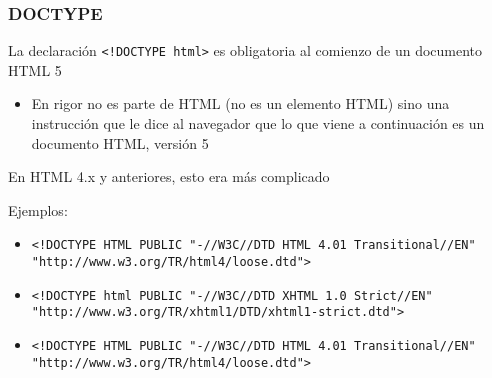 \documentclass[ucs]{beamer}
\begin{document}
\begin{frame}[fragile]
\frametitle{DOCTYPE}
La declaración 
\verb|<!DOCTYPE html>|
es obligatoria al comienzo de un documento HTML 5

\begin{itemize}
\item
En rigor no es parte de HTML (no es un elemento HTML) sino una instrucción
que le dice al navegador que lo que viene a continuación es un documento HTML, versión 5
\end{itemize}

En HTML 4.x y anteriores, esto era más complicado

Ejemplos:
    \begin{itemize}
    \item

  \begin{footnotesize}
  \begin{verbatim}
<!DOCTYPE HTML PUBLIC "-//W3C//DTD HTML 4.01 Transitional//EN" 
"http://www.w3.org/TR/html4/loose.dtd">
  \end{verbatim}
  \end{footnotesize}
    \item

  \begin{footnotesize}
  \begin{verbatim}
<!DOCTYPE html PUBLIC "-//W3C//DTD XHTML 1.0 Strict//EN" 
"http://www.w3.org/TR/xhtml1/DTD/xhtml1-strict.dtd">
  \end{verbatim}
  \end{footnotesize}
    \item

  \begin{footnotesize}
  \begin{verbatim}
<!DOCTYPE HTML PUBLIC "-//W3C//DTD HTML 4.01 Transitional//EN" 
"http://www.w3.org/TR/html4/loose.dtd">
  \end{verbatim}
  \end{footnotesize}
    \end{itemize}


\end{frame}
\end{document}
